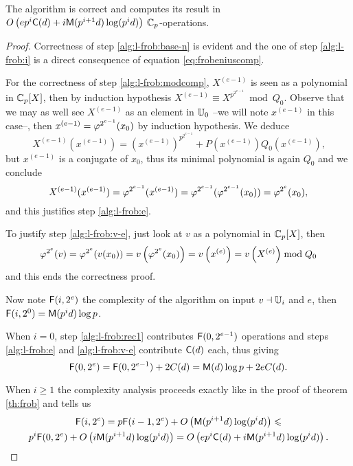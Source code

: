 \sloppy
\begin{theorem}
  \label{th:l-frob}
  The algorithm  is correct and computes
  its result in
  $O\left(ep^i\mathrm{\sf C}(d) + i\mathrm{\sf M}(p^{i+1}d)\log(p^id)\right)$
  $\mathbb{C}_p$-operations.
\end{theorem}
\fussy
\begin{proof}
  Correctness of step \ref{alg:l-frob:base-n} is evident and the one
  of step \ref{alg:l-frob:i} is a direct consequence of equation
  \eqref{eq:frobeniuscomp}.

  For the correctness of step \ref{alg:l-frob:modcomp}, $X^{(e-1)}$ is
  seen as a polynomial in $\mathbb{C}_p[X]$, then by induction hypothesis
  $X^{(e-1)}\equiv X^{p^{2^{e-1}}}\bmod Q_0$. Observe that we may as
  well see $X^{(e-1)}$ as an element in $\mathbb{U}_0$ --we will note
  $x^{(e-1)}$ in this case--, then $x^{(e-1)}=\varphi^{2^{e-1}}(x_0)$ by
  induction hypothesis. We deduce
  \begin{equation*}
    X^{(e-1)}(x^{(e-1)}) =
    (x^{(e-1)})^{p^{2^{e-1}}} + P(x^{(e-1)})Q_0(x^{(e-1)})
    \text{,}
  \end{equation*}
  but $x^{(e-1)}$ is a conjugate of $x_0$, thus its minimal polynomial
  is again $Q_0$ and we conclude
  \begin{equation*}
    X^{(e-1)}(x^{(e-1)}) = \varphi^{2^{e-1}}(x^{(e-1)}) =
    \varphi^{2^{e-1}}(\varphi^{2^{e-1}}(x_0)) =
    \varphi^{2^e}(x_0) \text{,}
  \end{equation*}
  and this justifies step \ref{alg:l-frob:e}.

  To justify step \ref{alg:l-frob:v-e}, just look at $v$ as a
  polynomial in $\mathbb{C}_p[X]$, then 
  \begin{equation*}
    \varphi^{2^e}(v) =
    \varphi^{2^e}(v(x_0)) = v\left(\varphi^{2^e}(x_0)\right) =
    v\left(x^{(e)}\right) = v\left(X^{(e)}\right) \bmod Q_0
  \end{equation*}
  and this ends the correctness proof.

  Now note $\mathrm{\sf F}(i,2^e)$ the complexity of the algorithm on input
  $v\dashv\mathbb{U}_i$ and $e$, then $\mathrm{\sf F}(i,2^0) = \mathrm{\sf M}(p^id)\log p$.

  When $i=0$, step \ref{alg:l-frob:rec1} contributes
  $\mathrm{\sf F}(0,2^{e-1})$ operations and steps \ref{alg:l-frob:e} and
  \ref{alg:l-frob:v-e} contribute $\mathrm{\sf C}(d)$ each, thus giving
  \begin{equation*}
    \mathrm{\sf F}(0,2^e) = \mathrm{\sf F}(0,2^{e-1}) + 2C(d) = 
    \mathrm{\sf M}(d)\log p+2eC(d)\text{.}
  \end{equation*}

  When $i\ge1$ the complexity analysis proceeds exactly like in the
  proof of theorem \ref{th:frob} and tells us
  \begin{multline*}
    \mathrm{\sf F}(i,2^e) =
    p\mathrm{\sf F}(i-1,2^e) + O\left(\mathrm{\sf M}(p^{i+1}d)\log(p^id)\right)\leqslant\\
    p^i\mathrm{\sf F}(0,2^e) + O\left(i\mathrm{\sf M}(p^{i+1}d)\log(p^id)\right) =
    O\left(ep^i\mathrm{\sf C}(d) + i\mathrm{\sf M}(p^{i+1}d)\log(p^id)\right)
    \text{.}
  \end{multline*}
\end{proof}

